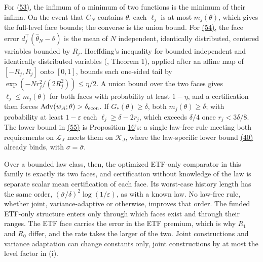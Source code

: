 \documentclass[11pt]{article}
\begin{document}
For \hyperref[eq:53]{(53)}, the infimum of a minimum of two functions is the
minimum of their infima. On the event that \(C_N\) contains
\(\theta\), each \(\ell_j\) is at most \(m_j(\theta)\), which
gives the full-level face bounds; the converse is the union
bound. For \hyperref[eq:54]{(54)}, the face error
\(d_j^\top(\widehat\theta_N-\theta)\) is the mean of \(N\)
independent, identically distributed, centered variables
bounded by \(R_j\). Hoeffding's inequality for bounded
independent and identically distributed variables
(\cite{maurer2009empirical}, Theorem 1), applied after an affine map
of \([-R_j,R_j]\) onto \([0,1]\), bounds each one-sided tail
by \(\exp(-Nr_j^2/(2R_j^2))\leq\eta/2\). A union bound over the
two faces gives \(\ell_j\leq m_j(\theta)\) for both faces with
probability at least \(1-\eta\), and a certification then
forces \(\operatorname{Adv}(w_A;\theta)>\delta_{\rm econ}\).
If \(G_*(\theta)\geq\delta\), both
\(m_j(\theta)\geq\delta\); with probability at least
\(1-\varepsilon\) each \(\ell_j\geq\delta-2r_j\), which
exceeds \(\delta/4\) once \(r_j<3\delta/8\). The lower bound in
\hyperref[eq:55]{(55)} is Proposition \hyperref[res:Proposition-16]{16}'s: a single law-free rule meeting both
requirements on \(\mathcal L_J\) meets them on
\(\mathcal K_J\), where the law-specific lower bound \hyperref[eq:40]{(40)}
already binds, with \(\sigma=\bar\sigma\).

Over a bounded law class, then, the optimized ETF-only
comparator in this family is exactly its two faces, and
certification without knowledge of the law is separate scalar
mean certification of each face. Its worst-case history length
has the same order,
\((\bar\sigma/\delta)^2\log(1/\varepsilon)\), as with a
known law. No law-free rule, whether joint, variance-adaptive
or otherwise, improves that order. The funded ETF-only
structure enters only through which faces exist and through
their ranges. The ETF face carries the error in the ETF
premium, which is why \(R_1\) and \(R_0\) differ, and the rate
takes the larger of the two. Joint constructions and variance
adaptation can change constants only, joint constructions by at
most the level factor in (i).
\end{document}
